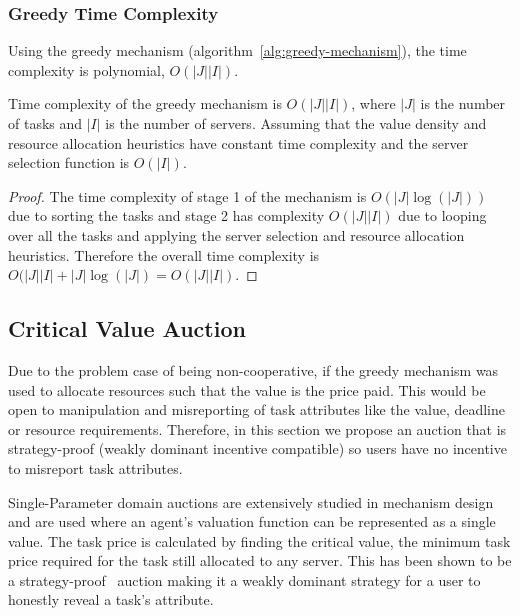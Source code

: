 \subsubsection{Greedy Time Complexity}
\label{subsubsec:greedy-time-complexity}
Using the greedy mechanism (algorithm~\ref{alg:greedy-mechanism}), the time complexity is polynomial,
$O(\left|J\right| \left|I\right|)$.
\begin{theorem}
    Time complexity of the greedy mechanism is $O(\left|J\right| \left|I\right|)$, where $\left|J\right|$ is the number
    of tasks and $\left|I\right|$ is the number of servers. Assuming that the value density and resource allocation
    heuristics have constant time complexity and the server selection function is $O(\left|I\right|)$.
\end{theorem}
\begin{proof}
    The time complexity of stage 1 of the mechanism is $O(\left|J\right| \log(\left|J\right|))$ due to sorting the
    tasks and stage 2 has complexity $O(\left|J\right| \left|I\right|)$ due to looping over all the tasks and
    applying the server selection and resource allocation heuristics. Therefore the overall time complexity is
    $O(\left|J\right| \left|I\right| + \left|J\right| \log(\left|J\right|) = O(\left|J\right| \left|I\right|)$.
\end{proof}

\subsection{Critical Value Auction}
\label{subsec:critical-value-auction}
Due to the problem case of being non-cooperative, if the greedy mechanism was used to allocate resources such that the
value is the price paid. This would be open to manipulation and misreporting of task attributes like the value,
deadline or resource requirements. Therefore, in this section we propose an auction that is strategy-proof
(weakly dominant incentive compatible) so users have no incentive to misreport task attributes.

Single-Parameter domain auctions are extensively studied in mechanism design~\cite{nisan2007algorithmic_228} and are
used where an agent's valuation function can be represented as a single value. The task price is calculated by finding
the critical value, the minimum task price required for the task still allocated to any server. This has
been shown to be a strategy-proof~\cite{nisan2007algorithmic_229_230} auction making it a weakly dominant strategy for
a user to honestly reveal a task's attribute.

